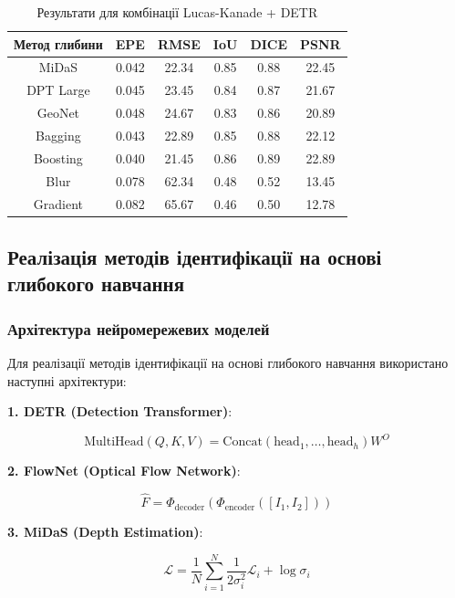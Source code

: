 \documentclass[14pt, a4paper]{extarticle}
\numberwithin{equation}{section}
\begin{document}
\begin{table}[H]
\centering
\caption{Результати для комбінації Lucas-Kanade + DETR}
\begin{tabular}{|c|c|c|c|c|c|}
\hline
\textbf{Метод глибини} & \textbf{EPE} & \textbf{RMSE} & \textbf{IoU} & \textbf{DICE} & \textbf{PSNR} \\
\hline
MiDaS & 0.042 & 22.34 & 0.85 & 0.88 & 22.45 \\
DPT Large & 0.045 & 23.45 & 0.84 & 0.87 & 21.67 \\
GeoNet & 0.048 & 24.67 & 0.83 & 0.86 & 20.89 \\
Bagging & 0.043 & 22.89 & 0.85 & 0.88 & 22.12 \\
Boosting & 0.040 & 21.45 & 0.86 & 0.89 & 22.89 \\
Blur & 0.078 & 62.34 & 0.48 & 0.52 & 13.45 \\
Gradient & 0.082 & 65.67 & 0.46 & 0.50 & 12.78 \\
\hline
\end{tabular}
\label{tab:lucaskanade}
\end{table}

\subsection{Реалізація методів ідентифікації на основі глибокого навчання}

\subsubsection{Архітектура нейромережевих моделей}

Для реалізації методів ідентифікації на основі глибокого навчання використано наступні архітектури:

\textbf{1. DETR (Detection Transformer)}:

\begin{equation}
\text{MultiHead}(Q, K, V) = \text{Concat}(\text{head}_1, \ldots, \text{head}_h) W^O \tag{4.26}
\end{equation}

\textbf{2. FlowNet (Optical Flow Network)}:

\begin{equation}
\hat{F} = \Phi_{\text{decoder}}(\Phi_{\text{encoder}}([I_1, I_2])) \tag{4.27}
\end{equation}

\textbf{3. MiDaS (Depth Estimation)}:

\begin{equation}
\mathcal{L} = \frac{1}{N} \sum_{i=1}^N \frac{1}{2\sigma_i^2} \mathcal{L}_i + \log \sigma_i \tag{4.28}
\end{equation}
\end{document}
